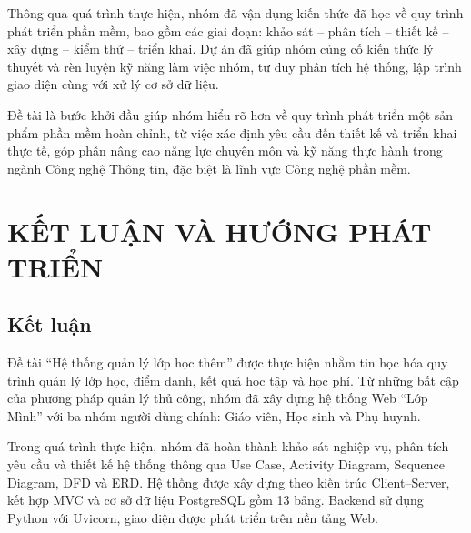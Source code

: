\documentclass[12pt,a4paper]{report}
\begin{document}
Thông qua quá trình thực hiện, nhóm đã vận dụng kiến thức đã học về quy trình phát triển phần mềm, bao gồm các giai đoạn: khảo sát -- phân tích -- thiết kế -- xây dựng -- kiểm thử -- triển khai. Dự án đã giúp nhóm củng cố kiến thức lý thuyết và rèn luyện kỹ năng làm việc nhóm, tư duy phân tích hệ thống, lập trình giao diện cùng với xử lý cơ sở dữ liệu.

Đề tài là bước khởi đầu giúp nhóm hiểu rõ hơn về quy trình phát triển một sản phẩm phần mềm hoàn chỉnh, từ việc xác định yêu cầu đến thiết kế và triển khai thực tế, góp phần nâng cao năng lực chuyên môn và kỹ năng thực hành trong ngành Công nghệ Thông tin, đặc biệt là lĩnh vực Công nghệ phần mềm.



\renewcommand{\listfigurename}{DANH MỤC HÌNH ẢNH}
\listoffigures
{}

\renewcommand{\listtablename}{DANH MỤC BẢNG}
\listoftables
{}

\newpage
{}










\chapter*{KẾT LUẬN VÀ HƯỚNG PHÁT TRIỂN}
\section*{Kết luận}

Đề tài ``Hệ thống quản lý lớp học thêm'' được thực hiện nhằm tin học hóa quy trình quản lý lớp học, điểm danh, kết quả học tập và học phí. Từ những bất cập của phương pháp quản lý thủ công, nhóm đã xây dựng hệ thống Web ``Lớp Mình'' với ba nhóm người dùng chính: Giáo viên, Học sinh và Phụ huynh.

Trong quá trình thực hiện, nhóm đã hoàn thành khảo sát nghiệp vụ, phân tích yêu cầu và thiết kế hệ thống thông qua Use Case, Activity Diagram, Sequence Diagram, DFD và ERD. Hệ thống được xây dựng theo kiến trúc Client--Server, kết hợp MVC và cơ sở dữ liệu PostgreSQL gồm 13 bảng. Backend sử dụng Python với Uvicorn, giao diện được phát triển trên nền tảng Web.
\end{document}
